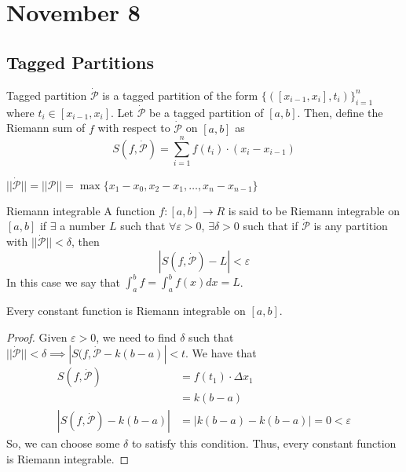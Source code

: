 \chapter{November 8}

\section{Tagged Partitions}
\begin{definition}{Tagged partition}{}
    $\dot{\mathcal{P}}$ is a tagged partition of the form $\{([x_{i - 1}, x_i], t_i)\}_{i = 1}^n$ where $t_i \in [x_{i - 1}, x_i]$. Let $\dot{\mathcal{P}}$ be a tagged partition of $[a, b]$. Then, define the Riemann sum of $f$ with respect to $\dot{\mathcal{P}}$ on $[a, b]$ as $$S(f, \dot{\mathcal{P}}) = \sum_{i = 1}^n f(t_i) \cdot (x_i - x_{i - 1})$$
\end{definition}
\begin{note}
    $||\dot{\mathcal{P}}|| = ||\mathcal{P}|| = \max\{x_1 - x_0, x_2 - x_1, \ldots, x_n - x_{n - 1}\}$
\end{note}

\begin{definition}{Riemann integrable}{}
    A function $f: [a, b] \to R$ is said to be Riemann integrable on $[a, b]$ if $\exists$ a number $L$ such that $\forall \varepsilon > 0$, $\exists \delta > 0$ such that if $\dot{\mathcal{P}}$ is any partition with $||\dot{\mathcal{P}}|| < \delta$, then $$\left| S(f, \dot{\mathcal{P}}) - L \right| < \varepsilon$$
    In this case we say that $\int_a^b f = \int_a^b f(x) dx = L$.
\end{definition}

\begin{theorem}{}{}
    Every constant function is Riemann integrable on $[a, b]$.
\end{theorem}
\begin{proof}
    Given $\varepsilon > 0$, we need to find $\delta$ such that $||\dot{\mathcal{P}}|| < \delta \implies |S(f, \dot{\mathcal{P}} - k(b - a)| < t$. We have that
    \begin{align*}
        S(f, \dot{\mathcal{P}}) &= f(t_1) \cdot \Delta x_1 \\
        &= k(b - a) \\
        |S(f, \dot{\mathcal{P}}) - k(b - a)| &= |k(b - a) - k(b - a)| = 0 < \varepsilon
    \end{align*}
    So, we can choose some $\delta$ to satisfy this condition. Thus, every constant function is Riemann integrable.
\end{proof}

